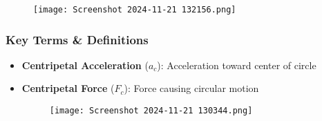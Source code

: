 \documentclass{beamer}
\begin{document}
\begin{frame}
\begin{figure}
    \centering
    \texttt{[image: Screenshot 2024-11-21 132156.png]}
\end{figure}
\end{frame}

\begin{frame}
\frametitle{Key Terms \& Definitions}
\begin{itemize}
        \item \textbf{Centripetal Acceleration} ($a_c$): Acceleration toward center of circle
    \item \textbf{Centripetal Force} ($F_c$): Force causing circular motion
\begin{figure}
    \centering
    \texttt{[image: Screenshot 2024-11-21 130344.png]}
\end{figure}
    
\end{itemize}
\end{frame}
\end{document}
